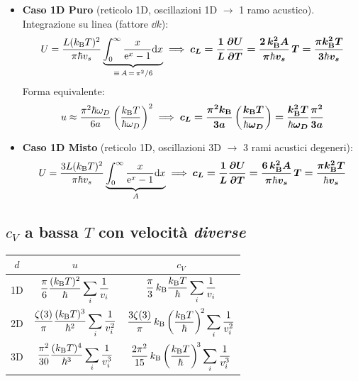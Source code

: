 \begin{itemize}
    \item \textbf{Caso 1D Puro} (reticolo 1D, oscillazioni 1D $\to$ 1 ramo acustico). Integrazione su linea (fattore $\dd k$):
    \[ U = \frac{L (k_{\mathrm{B}} T)^2}{\pi \hbar v_s}\underbrace{\int_0^\infty \frac{x}{\mathrm{e}^x - 1}\mathrm{d} x}_{\equiv\,A\,=\,\pi^2/6}
       \implies \bm{c_L = \frac{1}{L}\frac{\partial U}{\partial T} = \frac{2\,k_{\mathrm{B}}^2 A}{\pi \hbar v_s}\,T
                  = \frac{\pi k_{\mathrm{B}}^2 T}{3\hbar v_s}} \]
    Forma equivalente:
    \[ u \approx \frac{\pi^2\hbar\omega_D}{6a}\left(\frac{k_{\mathrm{B}} T}{\hbar\omega_D}\right)^2
       \implies \bm{c_L = \frac{\pi^2 k_{\mathrm{B}}}{3a}\left(\frac{k_{\mathrm{B}} T}{\hbar\omega_D}\right)
                   = \frac{k_{\mathrm{B}}^2 T}{\hbar\omega_D}\frac{\pi^2}{3a}} \]

    \item \textbf{Caso 1D Misto} (reticolo 1D, oscillazioni 3D $\to$ 3 rami acustici degeneri):
    \[ U = \frac{3 L (k_{\mathrm{B}} T)^2}{\pi \hbar v_s}\underbrace{\int_0^\infty \frac{x}{\mathrm{e}^x - 1}\mathrm{d} x}_{A}
       \implies \bm{c_L = \frac{1}{L}\frac{\partial U}{\partial T} = \frac{6\,k_{\mathrm{B}}^2 A}{\pi \hbar v_s}\,T = \frac{\pi k_{\mathrm{B}}^2 T}{\hbar v_s}} \]
\end{itemize}


\subsection{$c_V$ a bassa $T$ con velocità \emph{diverse}}
\begin{center}
\renewcommand{\arraystretch}{2.0}
\begin{tabular}{c c c}
\toprule
$d$ & $u$  & $c_V$ \\
\midrule
1D & $\dfrac{\pi}{6}\dfrac{(k_{\mathrm{B}} T)^2}{\hbar}\displaystyle\sum_i\frac{1}{v_i}$ &
     $\dfrac{\pi}{3}\,k_{\mathrm{B}}\dfrac{k_{\mathrm{B}} T}{\hbar}\displaystyle\sum_i\frac{1}{v_i}$ \\
2D & $\dfrac{\zeta(3)}{\pi}\dfrac{(k_{\mathrm{B}} T)^3}{\hbar^2}\displaystyle\sum_i\frac{1}{v_i^2}$ &
     $\dfrac{3\zeta(3)}{\pi}\,k_{\mathrm{B}}\left(\dfrac{k_{\mathrm{B}} T}{\hbar}\right)^{\!2}\displaystyle\sum_i\frac{1}{v_i^2}$ \\
3D & $\dfrac{\pi^2}{30}\dfrac{(k_{\mathrm{B}} T)^4}{\hbar^3}\displaystyle\sum_i\frac{1}{v_i^3}$ &
     $\dfrac{2\pi^2}{15}\,k_{\mathrm{B}}\left(\dfrac{k_{\mathrm{B}} T}{\hbar}\right)^{\!3}\displaystyle\sum_i\frac{1}{v_i^3}$ \\
\bottomrule
\end{tabular}
\end{center}


